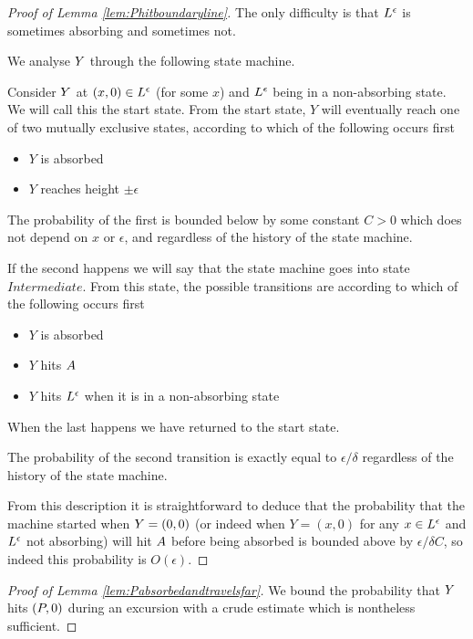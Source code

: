 {\begin{proof}[Proof of Lemma \ref{lem:Phitboundaryline}]
The only difficulty is that $L^\epsilon$ is sometimes absorbing and
sometimes not.

We analyse $Y$ through the following state machine.

Consider $Y$ at $(x,0) \in L^\epsilon$ (for some $x$) and $L^\epsilon$ being in
a non-absorbing state.  We will call this the start state.  From the
start state, $Y$ will eventually reach one of two mutually exclusive
states, according to which of the following occurs first

\newcommand{\intermediatelines}{I}

\begin{itemize}
\item $Y$ is absorbed
\item $Y$ reaches height $\pm\epsilon$
\end{itemize}

The probability of the first is bounded below by some constant $C > 0$
which does not depend on $x$ or $\epsilon$, and regardless of the
history of the state machine.

\newcommand{\stateintermediate}{Intermediate}

If the second happens we will say that the state machine goes into
state $\stateintermediate$.  From this state, the possible transitions
are according to which of the following occurs first

\begin{itemize}
\item $Y$ is absorbed
\item $Y$ hits $A$
\item $Y$ hits $L^\epsilon$ when it is in a non-absorbing state
\end{itemize}

When the last happens we have returned to the start state.

The probability of the second transition is exactly equal to
$\epsilon/\delta$ regardless of the history of the state machine.

From this description it is straightforward to deduce that the
probability that the machine started when $Y = (0,0)$ (or indeed when
$Y = (x, 0)$ for any $x \in L^\epsilon$ and $L^\epsilon$ not absorbing) will hit
$A$ before being absorbed is
bounded above by $\epsilon/\delta C$, so indeed this probability is
$O(\epsilon)$.
\end{proof}

\begin{proof}[Proof of Lemma \ref{lem:Pabsorbedandtravelsfar}]
We bound the probability that $Y$ hits $(P,0)$ during an
excursion with a crude estimate which is nontheless sufficient.


\end{proof}}

